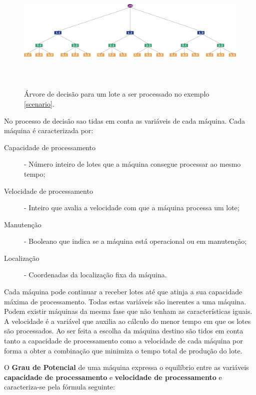 \begin{titlepage}
\begin{figure}[H]
  \raggedleft 
    \includegraphics[width=19cm, height = 6cm]{DecisionTreeMachines.png}
  \caption{Árvore de decisão para um lote a ser processado no exemplo \ref{scenario}.}
  \label{decisionMach}
\end{figure}

No processo de decisão sao tidas em conta as variáveis de cada máquina. Cada máquina é caracterizada por:

\begin{description}
\item[Capacidade de processamento] -  Número inteiro de lotes que a máquina consegue processar ao mesmo tempo;
\item[Velocidade de processamento] - Inteiro que avalia a velocidade com que a máquina processa um lote;
\item[Manutenção] - Booleano que indica se a máquina está operacional ou em manutenção;
\item[Localização] - Coordenadas da localização fixa da máquina.
\end{description}

Cada máquina pode continuar a receber lotes até que atinja a sua capacidade máxima de processamento. Todas estas variáveis são inerentes a uma máquina. Podem existir máquinas da mesma fase que não tenham as características iguais. A velocidade é a variável que auxilia ao cálculo do menor tempo em que os lotes são processados. Ao ser feita a escolha da máquina destino são tidos em conta tanto a capacidade de processamento como a velocidade de cada máquina por forma a obter a combinação que minimiza o tempo total de produção do lote.


O \textbf{Grau de Potencial} de uma máquina expressa o equilíbrio entre as variáveis \textbf{capacidade de processamento} e \textbf{velocidade de processamento} e caracteriza-se pela fórmula seguinte:


\end{titlepage}
